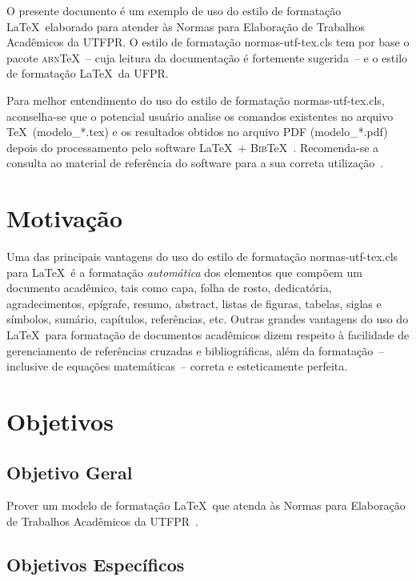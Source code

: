 \documentclass[openright]{normas-utf-tex} %
\begin{document}
O presente documento é um exemplo de uso do estilo de formatação \LaTeX\ elaborado para atender às Normas para Elaboração de Trabalhos Acadêmicos da UTFPR. O estilo de formatação {\ttfamily normas-utf-tex.cls} tem por base o pacote \textsc{abn}\TeX~-- cuja leitura da documentação \cite{abnTeX2009} é fortemente sugerida~-- e o estilo de formatação \LaTeX\ da UFPR.

Para melhor entendimento do uso do estilo de formatação {\ttfamily normas-utf-tex.cls}, aconselha-se que o potencial usuário analise os comandos existentes no arquivo \TeX\ ({\ttfamily modelo\_*.tex}) e os resultados obtidos no arquivo PDF ({\ttfamily modelo\_*.pdf}) depois do processamento pelo software \LaTeX\ + \textsc{Bib}\TeX~\cite{LaTeX2009,BibTeX2009}. Recomenda-se a consulta ao material de referência do software para a sua correta utilização~\cite{Lamport1986,Buerger1989,Kopka2003,Mittelbach2004}.

\section{Motivação}
\label{sec:motivacao}

Uma das principais vantagens do uso do estilo de formatação {\ttfamily normas-utf-tex.cls} para \LaTeX\ é a formatação \textit{automática} dos elementos que compõem um documento acadêmico, tais como capa, folha de rosto, dedicatória, agradecimentos, epígrafe, resumo, abstract, listas de figuras, tabelas, siglas e símbolos, sumário, capítulos, referências, etc. Outras grandes vantagens do uso do \LaTeX\ para formatação de documentos acadêmicos dizem respeito à facilidade de gerenciamento de referências cruzadas e bibliográficas, além da formatação~-- inclusive de equações  matemáticas~-- correta e esteticamente perfeita.

\section{Objetivos}
\label{sec:objetivos}

\subsection{Objetivo Geral}
\label{subsec:objetivoGeral}

Prover um modelo de formatação \LaTeX\ que atenda às Normas para Elaboração de Trabalhos Acadêmicos da UTFPR~\cite{UTFPR2008}.

\subsection{Objetivos Específicos}
\label{subsec:objetivosEspecificos}
\end{document}

